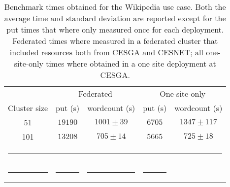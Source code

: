 \begin{table}[h!]
\caption{Benchmark times obtained for the Wikipedia use case. Both the average time and standard deviation are reported except for the put times that where only measured once for each deployment. Federated times where measured in a federated cluster that included resources both from CESGA and CESNET; all one-site-only times where obtained in a one site deployment at CESGA. }
\label{table:wikipedia}
%
\vspace{-0.5em}
%
\begin{center}
\begin{tabular}{ccccc}
\toprule
    					& \multicolumn{2}{c}{Federated} 		& \multicolumn{2}{c}{One-site-only} \\
Cluster size				& put (s)		& wordcount (s) 	& put (s)		& wordcount (s)\\
\midrule
51                   			& $19190$		& $1001\pm39$      	& $6705$		& $1347\pm117$\\
101                  			& $13208$		& $705\pm14$      	& $5665$		& $725\pm18$\\
%
\bottomrule
\multicolumn{5}{c}{\rule{0.98\textwidth}{0em}}\\
\rule{0.2\textwidth}{0cm} & \rule{0.2\textwidth}{0cm} & \rule{0.2\textwidth}{0cm} &  \rule{0.2\textwidth}{0cm} & \\
\end{tabular}
\end{center}
\end{table}



